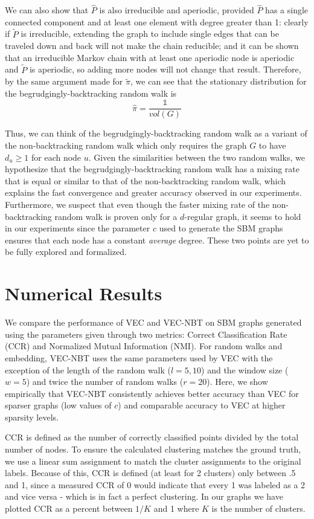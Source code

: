 \documentclass{article} %
\begin{document}
We can also show that $\hat P$ is also irreducible and aperiodic, provided $\hat P$ has a single connected component and at least one element with degree greater than 1: clearly if $\tilde P$ is irreducible, extending the graph to include single edges that can be traveled down and back will not make the chain reducible; and it can be shown that an irreducible Markov chain with at least one aperiodic node is aperiodic and $\tilde P$ is aperiodic, so adding more nodes will not change that result. Therefore, by the same argument made for $\tilde \pi$, we can see that the stationary distribution for the begrudgingly-backtracking random walk is
\[\hat \pi = \frac{\mathds{1}}{vol(G)}\]

Thus, we can think of the begrudgingly-backtracking random walk as a variant of the non-backtracking random walk which only requires the graph $G$ to have $d_u \geq 1$ for each node $u$. Given the similarities between the two random walks, we hypothesize that the begrudgingly-backtracking random walk has a mixing rate that is equal or similar to that of the non-backtracking random walk, which explains the fast convergence and greater accuracy observed in our experiments. Furthermore, we suspect that even though the faster mixing rate of the non-backtracking random walk is proven only for a $d$-regular graph, it seems to hold in our experiments since the parameter $c$ used to generate the SBM graphs ensures that each node has a constant \emph{average} degree. These two points are yet to be fully explored and formalized. 


\section{Numerical Results}

We compare the performance of VEC and VEC-NBT on SBM graphs generated using the parameters given through two metrics: Correct Classification Rate (CCR) and Normalized Mutual Information (NMI). For random walks and embedding, VEC-NBT uses the same parameters used by VEC with the exception of the length of the random walk ($l=5, 10$) and the window size ($w=5$) and twice the number of random walks ($r=20$). Here, we show empirically that VEC-NBT consistently achieves better accuracy than VEC for sparser graphs (low values of $c$) and comparable accuracy to VEC at higher sparsity levels.

CCR is defined as the number of correctly classified points divided by the total number of nodes. To ensure the calculated clustering matches the ground truth, we use a linear sum assignment to match the cluster assignments to the original labels. Because of this, CCR is defined (at least for 2 clusters) only between .5 and 1, since a measured CCR of 0 would indicate that every 1 was labeled as a 2 and vice versa - which is in fact a perfect clustering. In our graphs we have plotted CCR as a percent between $1/K$ and 1 where $K$ is the number of clusters.
\end{document}
